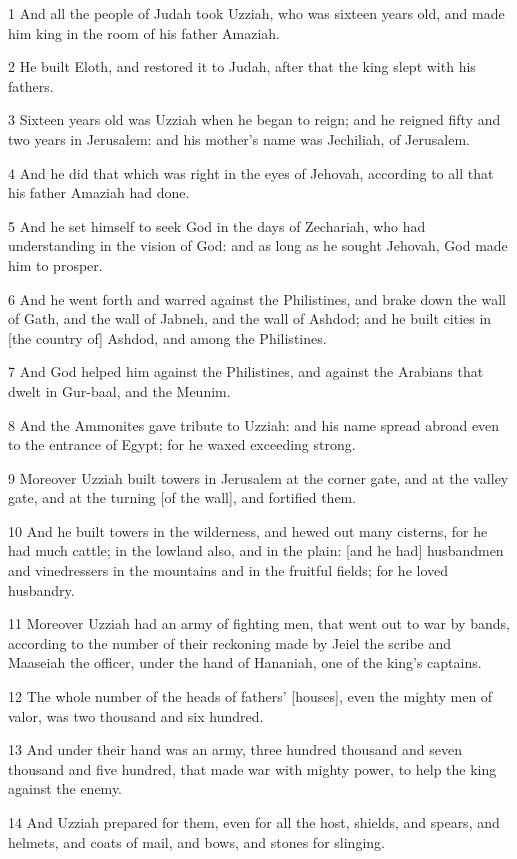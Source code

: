 \par 1 And all the people of Judah took Uzziah, who was sixteen years old, and made him king in the room of his father Amaziah.
\par 2 He built Eloth, and restored it to Judah, after that the king slept with his fathers.
\par 3 Sixteen years old was Uzziah when he began to reign; and he reigned fifty and two years in Jerusalem: and his mother's name was Jechiliah, of Jerusalem.
\par 4 And he did that which was right in the eyes of Jehovah, according to all that his father Amaziah had done.
\par 5 And he set himself to seek God in the days of Zechariah, who had understanding in the vision of God: and as long as he sought Jehovah, God made him to prosper.
\par 6 And he went forth and warred against the Philistines, and brake down the wall of Gath, and the wall of Jabneh, and the wall of Ashdod; and he built cities in [the country of] Ashdod, and among the Philistines.
\par 7 And God helped him against the Philistines, and against the Arabians that dwelt in Gur-baal, and the Meunim.
\par 8 And the Ammonites gave tribute to Uzziah: and his name spread abroad even to the entrance of Egypt; for he waxed exceeding strong.
\par 9 Moreover Uzziah built towers in Jerusalem at the corner gate, and at the valley gate, and at the turning [of the wall], and fortified them.
\par 10 And he built towers in the wilderness, and hewed out many cisterns, for he had much cattle; in the lowland also, and in the plain: [and he had] husbandmen and vinedressers in the mountains and in the fruitful fields; for he loved husbandry.
\par 11 Moreover Uzziah had an army of fighting men, that went out to war by bands, according to the number of their reckoning made by Jeiel the scribe and Maaseiah the officer, under the hand of Hananiah, one of the king's captains.
\par 12 The whole number of the heads of fathers' [houses], even the mighty men of valor, was two thousand and six hundred.
\par 13 And under their hand was an army, three hundred thousand and seven thousand and five hundred, that made war with mighty power, to help the king against the enemy.
\par 14 And Uzziah prepared for them, even for all the host, shields, and spears, and helmets, and coats of mail, and bows, and stones for slinging.

